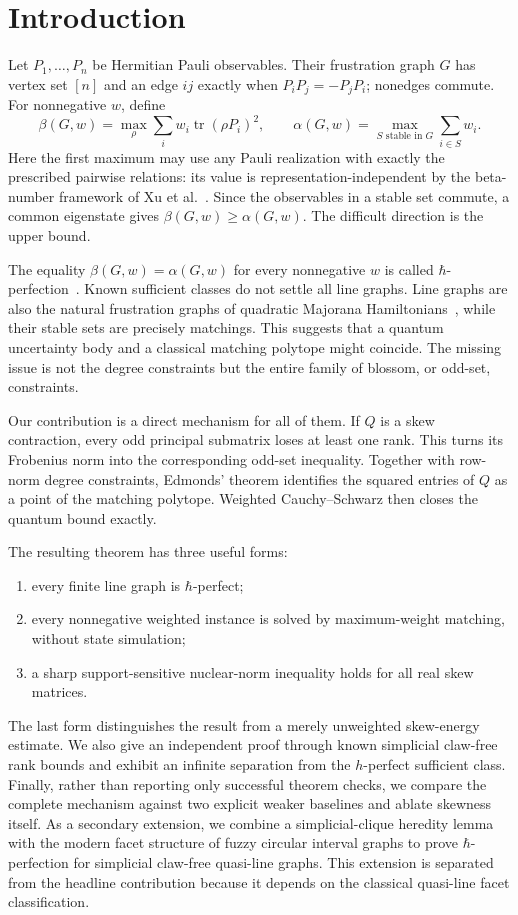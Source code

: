 \documentclass[11pt,a4paper]{article}
\theoremstyle{remark}
\newcommand{\tr}{\operatorname{tr}}
\begin{document}
\section{Introduction}

Let $P_1,\ldots,P_n$ be Hermitian Pauli observables. Their frustration graph
$G$ has vertex set $[n]$ and an edge $ij$ exactly when
$P_iP_j=-P_jP_i$; nonedges commute. For nonnegative $w$, define
\begin{equation}\label{eq:beta}
 \beta(G,w)=\max_\rho\sum_i w_i\tr(\rho P_i)^2,
 \qquad
 \alpha(G,w)=\max_{S\text{ stable in }G}\sum_{i\in S}w_i.
\end{equation}
Here the first maximum may use any Pauli realization with exactly the
prescribed pairwise relations: its value is representation-independent by the
beta-number framework of Xu et al.~\cite{xu,xuprx}. Since the observables in
a stable set commute, a common eigenstate gives
$\beta(G,w)\geq\alpha(G,w)$. The difficult direction is the upper bound.

The equality $\beta(G,w)=\alpha(G,w)$ for every nonnegative $w$ is called
$\hbar$-perfection~\cite{xu}. Known sufficient classes do not settle all line
graphs. Line graphs are also the natural frustration graphs of quadratic
Majorana Hamiltonians~\cite{cf,cem}, while their stable sets are precisely
matchings. This suggests that a quantum uncertainty body and a classical
matching polytope might coincide. The missing issue is not the degree
constraints but the entire family of blossom, or odd-set, constraints.

Our contribution is a direct mechanism for all of them. If $Q$ is a skew
contraction, every odd principal submatrix loses at least one rank. This turns
its Frobenius norm into the corresponding odd-set inequality. Together with
row-norm degree constraints, Edmonds' theorem identifies the squared entries
of $Q$ as a point of the matching polytope. Weighted Cauchy--Schwarz then
closes the quantum bound exactly.

The resulting theorem has three useful forms:
\begin{enumerate}
 \item every finite line graph is $\hbar$-perfect;
 \item every nonnegative weighted instance is solved by maximum-weight
 matching, without state simulation;
 \item a sharp support-sensitive nuclear-norm inequality holds for all real
 skew matrices.
\end{enumerate}
The last form distinguishes the result from a merely unweighted skew-energy
estimate. We also give an independent proof through known simplicial
claw-free rank bounds and exhibit an infinite separation from the
$h$-perfect sufficient class. Finally, rather than reporting only successful
theorem checks, we compare the complete mechanism against two explicit weaker
baselines and ablate skewness itself.
As a secondary extension, we combine a simplicial-clique heredity lemma with
the modern facet structure of fuzzy circular interval graphs to prove
$\hbar$-perfection for simplicial claw-free quasi-line graphs. This extension
is separated from the headline contribution because it depends on the
classical quasi-line facet classification.
\end{document}
